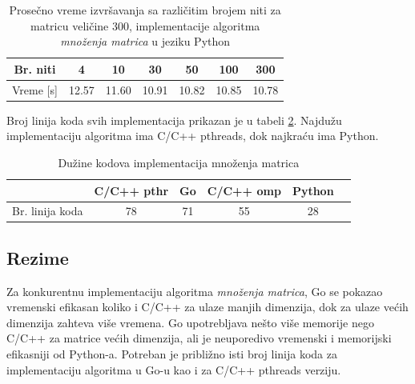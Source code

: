 \documentclass[12pt,oneside]{memoir}
\begin{document}
\begin{table}
\begin{center}
\caption{Prosečno vreme izvršavanja sa različitim brojem niti  za matricu veličine 300, implementacije algoritma \textit{množenja matrica} u jeziku Python}
\begin{tabular}{||c||c|c|c|c|c|c||}
\hline
Br. niti &4 &10 &30 &50 &100 & 300  \\ \hline
Vreme [s]	&12.57	&11.60	&10.91	 & 10.82	&10.85	&10.78\\ \hline
\end{tabular}
\label{tab:matrix111}
\end{center}
\end{table}

Broj linija koda svih  implementacija prikazan je u tabeli \ref{tab:matrix2}. Najdužu implementaciju algoritma ima C/C++ pthreads, dok najkraću ima Python.

\begin{table}
\begin{center}
\caption{Dužine kodova implementacija množenja matrica}
\begin{tabular}{|c|c|c|c|c|c|}
\hline
		&  C/C++ pthr 	& Go	& C/C++ omp	& Python	\\ \hline
Br. linija koda& 78	& 71	&55		&28		\\ \hline
\end{tabular}
\label{tab:matrix2}
\end{center}
\end{table}

\subsection{Rezime}

Za konkurentnu implementaciju algoritma \textit{množenja matrica}, Go se pokazao vremenski efikasan koliko i C/C++ za ulaze manjih dimenzija, dok za ulaze većih dimenzija zahteva više vremena. Go upotrebljava nešto više memorije nego C/C++ za matrice većih dimenzija, ali je neuporedivo vremenski i memorijski efikasniji od Python-a. Potreban je približno isti broj linija koda za implementaciju algoritma u Go-u kao i za C/C++ pthreads verziju.

\end{document}
